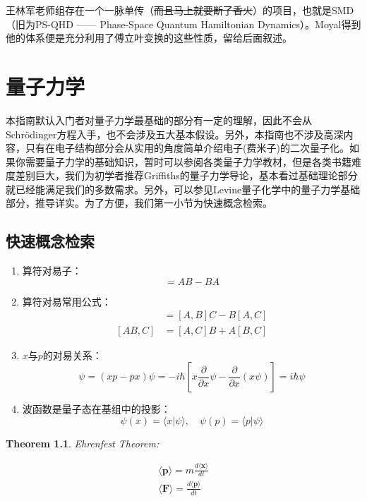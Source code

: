\documentclass[12pt,a4paper,openany,twoside]{book}
\newtheorem{theorem}{Theorem}[section]
\numberwithin{equation}{section}
\newcommand{\mean}[1]{\langle #1 \rangle}
\begin{document}
王林军老师组存在一个一脉单传（\sout{而且马上就要断了香火}）的项目，也就是SMD（旧为PS-QHD —— Phase-Space Quantum Hamiltonian Dynamics）。Moyal得到他的体系便是充分利用了傅立叶变换的这些性质，留给后面叙述。


  \chapter{量子力学}
  本指南默认入门者对量子力学最基础的部分有一定的理解，因此不会从Schr\"odinger方程入手，也不会涉及五大基本假设。另外，本指南也不涉及高深内容，只有在电子结构部分会从实用的角度简单介绍电子(费米子)的二次量子化。如果你需要量子力学的基础知识，暂时可以参阅各类量子力学教材，但是各类书籍难度差别巨大，我们为初学者推荐Griffiths的量子力学导论，基本看过基础理论部分就已经能满足我们的多数需求。另外，可以参见Levine量子化学中的量子力学基础部分，推导详实。为了方便，我们第一小节为快速概念检索。

  \section{快速概念检索}
    \begin{enumerate}
    \item 算符对易子：
    \begin{equation}
    [A,B] = AB - BA
    \end{equation}

    \item 算符对易常用公式：
    \begin{align}
    [A,BC]& = [A,B]C - B[A,C]\\
    [AB,C]& = [A,C]B + A[B,C]
    \end{align}

    \item $x$与$p$的对易关系：
    \begin{equation}
    [x,p]\psi=(xp-px)\psi = -i\hbar[x \frac{\partial}{\partial x}\psi-\frac{\partial}{\partial x}(x\psi)]= i\hbar \psi
    \end{equation}

    \item 波函数是量子态在基组中的投影：
    \begin{equation}
    \psi (x) = \langle x | \psi \rangle , \quad \psi(p) = \langle p | \psi \rangle
    \end{equation} 
  \end{enumerate}
  

  \begin{theorem}
    Ehrenfest Theorem:
    
    \begin{align}
    \mean{\textbf{p}}= m \frac{d \mean{\textbf{x}}}{dt}\\
    \mean{\textbf{F}}= \frac{d\mean{\textbf{p}}}{dt}
    \end{align}
    \end{theorem}
\end{document}

